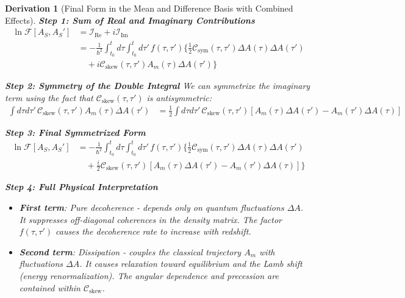 \documentclass[10pt, a4paper]{article}
\newtheorem{derivation}{Derivation}
\begin{document}
\begin{derivation}[Final Form in the Mean and Difference Basis with Combined Effects]
\textbf{Step 1: Sum of Real and Imaginary Contributions}
\begin{align}
\ln \mathcal{F}[A_S, A_S'] &= \mathcal{I}_{\text{Re}} + i\mathcal{I}_{\text{Im}} \\
&= -\frac{1}{\hbar^2} \int_{t_0}^{t} d\tau \int_{t_0}^{t} d\tau' \, f(\tau,\tau') \big\{ \frac{1}{2} \mathcal{C}_{\text{sym}}(\tau,\tau') \Delta A(\tau) \Delta A(\tau') \\
&\quad + i \mathcal{C}_{\text{skew}}(\tau,\tau') A_m(\tau) \Delta A(\tau') \big\}
\tag{22.1}
\end{align}

\textbf{Step 2: Symmetry of the Double Integral}
We can symmetrize the imaginary term using the fact that $\mathcal{C}_{\text{skew}}(\tau,\tau')$ is antisymmetric:
\begin{align}
\int d\tau d\tau' \, \mathcal{C}_{\text{skew}}(\tau,\tau') A_m(\tau) \Delta A(\tau') &= \frac{1}{2} \int d\tau d\tau' \, \mathcal{C}_{\text{skew}}(\tau,\tau') [A_m(\tau) \Delta A(\tau') - A_m(\tau') \Delta A(\tau)]
\tag{22.2}
\end{align}

\textbf{Step 3: Final Symmetrized Form}
\begin{align}
\ln \mathcal{F}[A_S, A_S'] &= -\frac{1}{\hbar^2} \int_{t_0}^{t} d\tau \int_{t_0}^{t} d\tau' \, f(\tau,\tau') \big\{ \frac{1}{2} \mathcal{C}_{\text{sym}}(\tau,\tau') \Delta A(\tau) \Delta A(\tau') \\
&\quad + \frac{i}{2} \mathcal{C}_{\text{skew}}(\tau,\tau') [A_m(\tau) \Delta A(\tau') - A_m(\tau') \Delta A(\tau)] \big\}
\tag{22.3}
\end{align}

\textbf{Step 4: Full Physical Interpretation}
\begin{itemize}
\item \textbf{First term}: Pure decoherence - depends only on quantum fluctuations $\Delta A$. It suppresses off-diagonal coherences in the density matrix. The factor $f(\tau,\tau')$ causes the decoherence rate to increase with redshift.

\item \textbf{Second term}: Dissipation - couples the classical trajectory $A_m$ with fluctuations $\Delta A$. It causes relaxation toward equilibrium and the Lamb shift (energy renormalization). The angular dependence and precession are contained within $\mathcal{C}_{\text{skew}}$.
\end{itemize}


\end{derivation}
\end{document}
